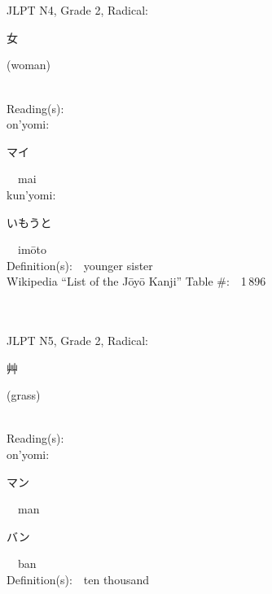 \begin{multicols}{2}
\ \ \\
{\fontsize{34pt}{40pt}  }\ \ \\  %
{JLPT N4, Grade 2, Radical:\ \ {\begin{CJK}{UTF8}{min} 女 \end{CJK}} (woman) } \\
Reading(s):\ \ \\
{\hspace*{1em}}on'yomi:\ \ \\
{\hspace*{2em}}{\begin{CJK}{UTF8}{min} マイ \end{CJK}}\ \ mai\ \ \\
{\hspace*{1em}}kun'yomi:\ \ \\
{\hspace*{2em}}{\begin{CJK}{UTF8}{min} いもうと \end{CJK}}\ \ im\=oto\ \ \\
Definition(s):\ \ younger sister \\
Wikipedia ``List of the J\=oy\=o Kanji'' Table \#:\ \ 1\,896 \\
\ \ \\
{\fontsize{34pt}{40pt}  }\ \ \\  %
{JLPT N5, Grade 2, Radical:\ \ {\begin{CJK}{UTF8}{min} 艸 \end{CJK}} (grass) } \\
Reading(s):\ \ \\
{\hspace*{1em}}on'yomi:\ \ \\
{\hspace*{2em}}{\begin{CJK}{UTF8}{min} マン \end{CJK}}\ \ man\ \ \\
{\hspace*{2em}}{\begin{CJK}{UTF8}{min} バン \end{CJK}}\ \ ban\ \ \\
Definition(s):\ \ ten thousand \\

\end{multicols}
